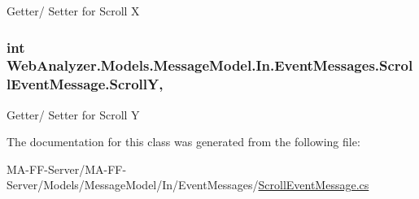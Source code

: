 Getter/ Setter for Scroll X 

\hypertarget{class_web_analyzer_1_1_models_1_1_message_model_1_1_in_1_1_event_messages_1_1_scroll_event_message_ab7c3211d465e80a5d8f1cf40a0a690ff}{}
\subsubsection[{Scroll\+Y}]{\setlength{\rightskip}{0pt plus 5cm}int Web\+Analyzer.\+Models.\+Message\+Model.\+In.\+Event\+Messages.\+Scroll\+Event\+Message.\+Scroll\+Y\hspace{0.3cm}{\ttfamily [get]}, {\ttfamily [set]}}\label{class_web_analyzer_1_1_models_1_1_message_model_1_1_in_1_1_event_messages_1_1_scroll_event_message_ab7c3211d465e80a5d8f1cf40a0a690ff}


Getter/ Setter for Scroll Y 



The documentation for this class was generated from the following file\+:\begin{DoxyCompactItemize}
\item 
M\+A-\/\+F\+F-\/\+Server/\+M\+A-\/\+F\+F-\/\+Server/\+Models/\+Message\+Model/\+In/\+Event\+Messages/\hyperlink{_scroll_event_message_8cs}{Scroll\+Event\+Message.\+cs}\end{DoxyCompactItemize}
